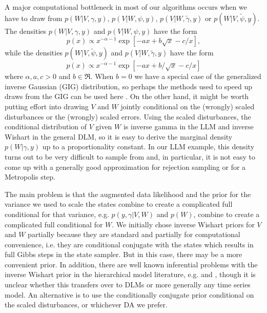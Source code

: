 \documentclass[12pt]{article}
\begin{document}
A major computational bottleneck in most of our algorithms occurs when we have to draw from $p(W|V,\gamma,y)$, $p(V|W,\psi,y)$, $p(V|W,\tilde{\gamma},y)$ or $p(W|V,\tilde{\psi},y)$. The densities $p(W|V,\gamma,y)$ and $p(V|W,\psi,y)$ have the form
\[
p(x)\propto x^{-\alpha-1}\exp\left[-ax + b\sqrt{x} - c/x\right],
\]
while the densities $p(W|V,\tilde{\psi},y)$ and $p(V|W,\tilde{\gamma},y)$ have the form
\[
p(x)\propto x^{-\alpha-1}\exp\left[ -ax + b/\sqrt{x} -c/x\right]
\]
where $\alpha,a,c>0$ and $b\in\Re$. When $b=0$ we have a special case of the generalized inverse Gaussian (GIG) distribution, so perhaps the methods used to speed up draws from the GIG can be used here \cite{jorgensen1982statistical,dagpunar1989easily,devroye2012random}. On the other hand, it might be worth putting effort into drawing $V$ and $W$ jointly conditional on the (wrongly) scaled disturbances or the (wrongly) scaled errors. Using the scaled disturbances, the conditional distribution of $V$ given $W$ is inverse gamma in the LLM and inverse Wishart in the general DLM, so it is easy to derive the marginal density $p(W|\gamma,y)$ up to a proportionality constant. In our LLM example, this density turns out to be very difficult to sample from and, in particular, it is not easy to come up with a generally good approximation for rejection sampling or for a Metropolis step.

The main problem is that the augmented data likelihood and the prior for the variance we used to scale the states combine to create a complicated full conditional for that variance, e.g. $p(y,\gamma|V,W)$ and $p(W)$, combine to create a complicated full conditional for $W$. We initially chose inverse Wishart priors for $V$ and $W$ partially because they are standard and partially for computational convenience, i.e. they are conditional conjugate with the states which results in full Gibbs steps in the state sampler. But in this case, there may be a more convenient prior. In addition, there are well known inferential problems with the inverse Wishart prior in the hierarchical model literature, e.g. \citet{gelman2006prior} and \citet{alvarez2014cov}, though it is unclear whether this transfers over to DLMs or more generally any time series model. An alternative is to use the conditionally conjugate prior conditional on the scaled disturbances, or whichever DA we prefer.
\end{document}
